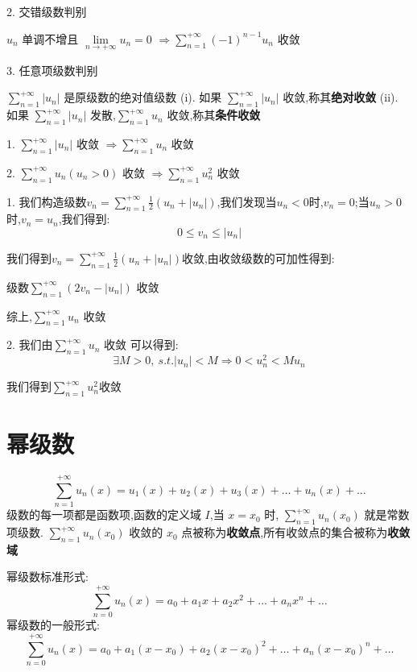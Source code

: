 2. 交错级数判别
\begin{theorem}[莱布尼茨判别法]
	$u_{n}$ 单调不增且 $\lim\limits_{n\rightarrow +\infty}u_{n}=0$  $\Rightarrow\sum\limits_{n=1}^{+\infty}(-1)^{n-1}u_{n}$ 收敛
\end{theorem}
3. 任意项级数判别
\begin{definition}
	$\sum\limits_{n=1}^{+\infty}|u_{n}|$ 是原级数的绝对值级数
	(i). 如果 $\sum\limits_{n=1}^{+\infty}|u_{n}|$ 收敛,称其\textbf{绝对收敛}
	(ii). 如果 $\sum\limits_{n=1}^{+\infty}|u_{n}|$ 发散,$\sum\limits_{n=1}^{+\infty}u_{n}$ 收敛,称其\textbf{条件收敛}
\end{definition}
\begin{theorem}
	1. $\sum\limits_{n=1}^{+\infty}|u_{n}|$ 收敛 $\Rightarrow\sum\limits_{n=1}^{+\infty}u_{n}$ 收敛

	2. $\sum\limits_{n=1}^{+\infty}u_{n}(u_{n}>0)$ 收敛 $\Rightarrow\sum\limits_{n=1}^{+\infty}u_{n}^2$ 收敛
\end{theorem}
\begin{anymark}[证明]

	1. 我们构造级数$v_{n}=\sum\limits_{n=1}^{+\infty}\frac{1}{2}(u_{n}+|u_{n}|)$,我们发现当$u_{n}<0$时,$v_{n}=0$;当$u_{n}>0$时,$v_{n}=u_{n}$,我们得到:
	$$0\leq v_{n}\leq |u_{n}|$$

	我们得到$v_{n}=\sum\limits_{n=1}^{+\infty}\frac{1}{2}(u_{n}+|u_{n}|)$收敛,由收敛级数的可加性得到:

	级数$\sum\limits_{n=1}^{+\infty}(2v_{n}-|u_{n}|)$ 收敛

	综上,$\sum\limits_{n=1}^{+\infty}u_{n}$ 收敛


	2. 我们由$\sum\limits_{n=1}^{+\infty}u_{n}$ 收敛 可以得到:
	$$\exists M>0,\ s.t. |u_{n}|<M\Rightarrow 0<u_{n}^2<Mu_{n}$$

	我们得到$\sum\limits_{n=1}^{+\infty}u_{n}^2$收敛
\end{anymark}
\section{幂级数}
\begin{definition}[幂级数]
	$$\sum\limits_{n=1}^{+\infty}u_{n}(x)=u_{1}(x)+u_{2}(x)+u_{3}(x)+\dots+u_{n}(x)+\dots$$
	级数的每一项都是函数项,函数的定义域 $I$,当 $x=x_{0}$ 时, $\sum\limits_{n=1}^{+\infty}u_{n}(x_{0})$ 就是常数项级数.
	$\sum\limits_{n=1}^{+\infty}u_{n}(x_{0})$ 收敛的 $x_{0}$ 点被称为\textbf{收敛点},所有收敛点的集合被称为\textbf{收敛域}
\end{definition}
\begin{definition}
	幂级数标准形式:
	$$\sum\limits_{n=0}^{+\infty}u_{n}(x)=a_{0}+a_{1}x+a_{2}x^{2}+\dots+a_{n}x^{n}+\dots$$
	幂级数的一般形式:
	$$\sum\limits_{n=0}^{+\infty}u_{n}(x)=a_{0}+a_{1}(x-x_{0})+a_{2}(x-x_{0})^{2}+\dots+a_{n}(x-x_{0})^{n}+\dots$$
\end{definition}


